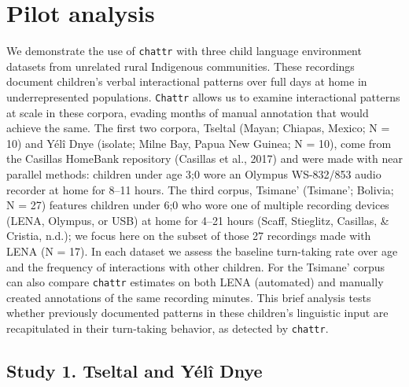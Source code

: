 \documentclass[10pt, letterpaper]{article}
\begin{document}
\hypertarget{pilot-analysis}{%
\section{Pilot analysis}\label{pilot-analysis}}

We demonstrate the use of \texttt{chattr} with three child language
environment datasets from unrelated rural Indigenous communities. These
recordings document children's verbal interactional patterns over full
days at home in underrepresented populations. \texttt{Chattr} allows us
to examine interactional patterns at scale in these corpora, evading
months of manual annotation that would achieve the same. The first two
corpora, Tseltal (Mayan; Chiapas, Mexico; N = 10) and Yélî Dnye
(isolate; Milne Bay, Papua New Guinea; N = 10), come from the Casillas
HomeBank repository (Casillas et al., 2017) and were made with near
parallel methods: children under age 3;0 wore an Olympus WS-832/853
audio recorder at home for 8--11 hours. The third corpus, Tsimane'
(Tsimane'; Bolivia; N = 27) features children under 6;0 who wore one of
multiple recording devices (LENA, Olympus, or USB) at home for 4--21
hours (Scaff, Stieglitz, Casillas, \& Cristia, n.d.); we focus here on
the subset of those 27 recordings made with LENA (N = 17). In each
dataset we assess the baseline turn-taking rate over age and the
frequency of interactions with other children. For the Tsimane' corpus
can also compare \texttt{chattr} estimates on both LENA (automated) and
manually created annotations of the same recording minutes. This brief
analysis tests whether previously documented patterns in these
children's linguistic input are recapitulated in their turn-taking
behavior, as detected by \texttt{chattr}.

\hypertarget{study-1.-tseltal-and-yuxe9luxee-dnye}{%
\subsection{Study 1. Tseltal and Yélî
Dnye}\label{study-1.-tseltal-and-yuxe9luxee-dnye}}
\end{document}
